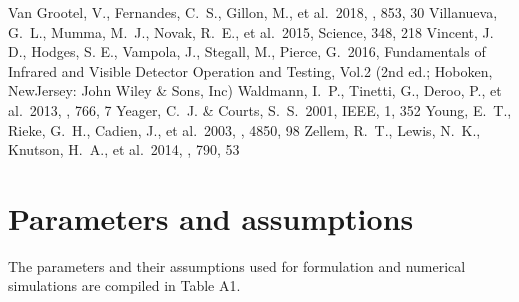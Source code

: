 \documentclass{aastex62}
\begin{document}
\begin{thebibliography}{}
 Van Grootel, V., Fernandes, C.~S., Gillon, M., et al.\ 2018, \apj, 853, 30
 Villanueva, G.~L., Mumma, M.~J., Novak, R.~E., et al.\ 2015, Science, 348, 218
 Vincent, J. D., Hodges, S. E., Vampola, J., Stegall, M., Pierce, G.\ 2016, Fundamentals of Infrared and Visible Detector Operation and Testing, Vol.2 (2nd ed.; Hoboken, NewJersey: John Wiley \& Sons, Inc)
 Waldmann, I.~P., Tinetti, G., Deroo, P., et al.\ 2013, \apj, 766, 7
 Yeager, C.~J. \& Courts, S.~S.\ 2001, IEEE, 1, 352
 Young, E.~T., Rieke, G.~H., Cadien, J., et al.\ 2003, \procspie, 4850, 98
 Zellem, R.~T., Lewis, N.~K., Knutson, H.~A., et al.\ 2014, \apj, 790, 53

\end{thebibliography}


\appendix
\section{Parameters and assumptions} \label{sec:appendixA}
The parameters and their assumptions used for formulation and numerical simulations are compiled in Table A1.
\end{document}
